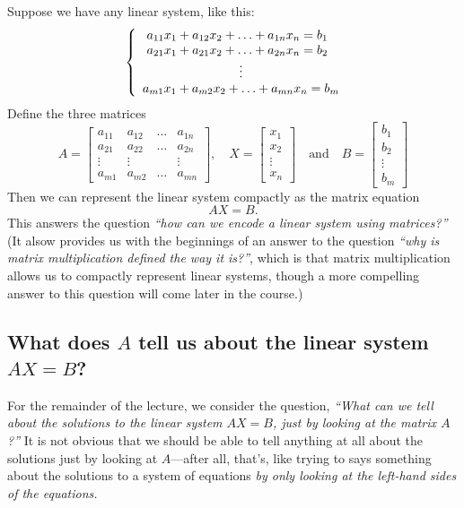 \documentclass[10pt]{article}
\theoremstyle{definition}
\begin{document}
Suppose we have any linear system, like this:
\begin{equation*}
  \left\{ \begin{array}{l@{}l}
      \ a_{11}x_{1}+a_{12}x_{2}+\ldots+a_{1n}x_{n} = b_{1} \\
      \ a_{21}x_{1}+a_{21}x_{2}+\ldots+a_{2n}x_{n} = b_{2} \\
      \hfill\vdots\hfill \\
      a_{m1}x_{1}+a_{m2}x_{2}+\ldots+a_{mn}x_{n} = b_{m}
    \end{array}\right.
\end{equation*}
Define the three matrices
\begin{equation*}
  A =
  \begin{bmatrix}
    a_{11}&a_{12}&\ldots& a_{1n}\\
    a_{21}&a_{22}&\ldots& a_{2n}\\
    \vdots&\vdots & &\vdots \\
    a_{m1}&a_{m2}&\ldots& a_{mn}
  \end{bmatrix},
  \quad
  X =
  \begin{bmatrix}
    x_{1}\\x_{2}\\\vdots\\x_{n}
  \end{bmatrix}
  \quad \text{and} \quad
  B =
  \begin{bmatrix}
    b_{1}\\b_{2}\\\vdots\\b_{m}
  \end{bmatrix}
\end{equation*}
Then we can represent the linear system compactly as the matrix equation
\begin{equation*}
  AX=B.
\end{equation*}
This answers the question \textit{``how can we encode a linear system using
  matrices?''} (It alsow provides us with the beginnings of an answer to the
question \textit{``why is matrix multiplication defined the way it is?''},
which is that matrix multiplication allows us to compactly represent linear
systems, though a more compelling answer to this question will come later in
the course.)

\subsection{What does \texorpdfstring{$A$}{A} tell us about
  the linear system \texorpdfstring{$AX=B$}{AX=B}?}
For the remainder of the lecture, we consider the question, \textit{``What can
  we tell about the solutions to the linear system $AX=B$, just by looking at
  the matrix $A$?''} It is not obvious that we should be able to tell anything
at all about the solutions just by looking at $A$---after all, that's, like
trying to says something about the solutions to a system of equations
\textit{by only looking at the left-hand sides of the equations.} 
\end{document}
